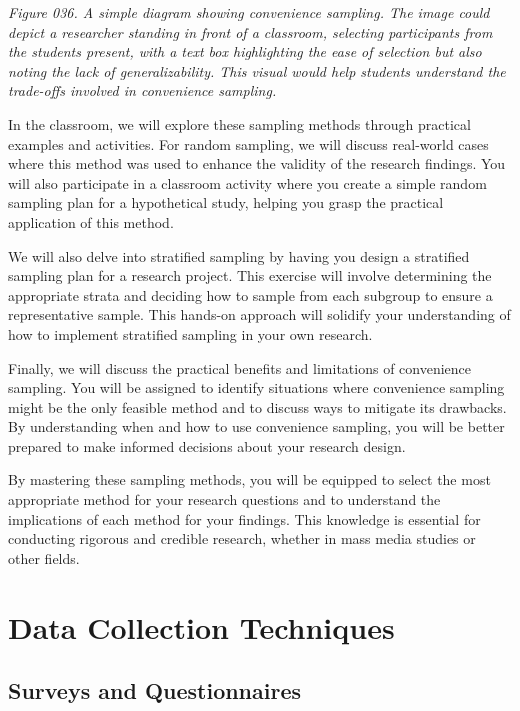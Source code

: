 \documentclass[
]{book}
\begin{document}
\emph{Figure 036. A simple diagram showing convenience sampling. The image could depict a researcher standing in front of a classroom, selecting participants from the students present, with a text box highlighting the ease of selection but also noting the lack of generalizability. This visual would help students understand the trade-offs involved in convenience sampling.}

In the classroom, we will explore these sampling methods through practical examples and activities. For random sampling, we will discuss real-world cases where this method was used to enhance the validity of the research findings. You will also participate in a classroom activity where you create a simple random sampling plan for a hypothetical study, helping you grasp the practical application of this method.

We will also delve into stratified sampling by having you design a stratified sampling plan for a research project. This exercise will involve determining the appropriate strata and deciding how to sample from each subgroup to ensure a representative sample. This hands-on approach will solidify your understanding of how to implement stratified sampling in your own research.

Finally, we will discuss the practical benefits and limitations of convenience sampling. You will be assigned to identify situations where convenience sampling might be the only feasible method and to discuss ways to mitigate its drawbacks. By understanding when and how to use convenience sampling, you will be better prepared to make informed decisions about your research design.

By mastering these sampling methods, you will be equipped to select the most appropriate method for your research questions and to understand the implications of each method for your findings. This knowledge is essential for conducting rigorous and credible research, whether in mass media studies or other fields.

\section{Data Collection Techniques}\label{data-collection-techniques}

\subsection{Surveys and Questionnaires}\label{surveys-and-questionnaires}
\end{document}
